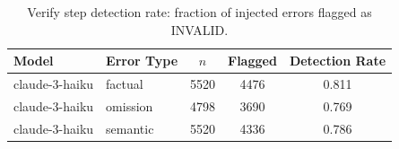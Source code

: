 \begin{table}[t]
\centering
\caption{Verify step detection rate: fraction of injected errors flagged as INVALID.}
\label{tab:verify}
\begin{tabular}{llccc}
\toprule
Model & Error Type & $n$ & Flagged & Detection Rate \\
\midrule
claude-3-haiku & factual & 5520 & 4476 & 0.811 \\
claude-3-haiku & omission & 4798 & 3690 & 0.769 \\
claude-3-haiku & semantic & 5520 & 4336 & 0.786 \\
\bottomrule
\end{tabular}
\end{table}